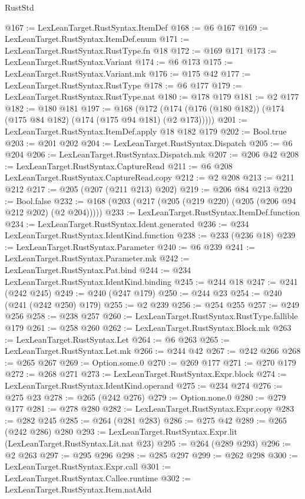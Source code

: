 \begin{lexlean}{RustStd}
\begin{coremodule}
{\begin{coremodule}
{{{{{{{{{@167 := LexLeanTarget.RustSyntax.ItemDef
@168 := @6 @167
@169 := LexLeanTarget.RustSyntax.ItemDef.enum
@171 := LexLeanTarget.RustSyntax.RustType.fn @18
@172 := @169 @171
@173 := LexLeanTarget.RustSyntax.Variant
@174 := @6 @173
@175 := LexLeanTarget.RustSyntax.Variant.mk
@176 := @175 @42
@177 := LexLeanTarget.RustSyntax.RustType
@178 := @6 @177
@179 := LexLeanTarget.RustSyntax.RustType.nat
@180 := @178 @179
@181 := @2 @177
@182 := @180 @181
@197 := @168
    (@172 (@174 (@176 (@180 @182)) (@174 (@175 @84 @182) (@174 (@175 @94 @181) (@2 @173)))))
@201 := LexLeanTarget.RustSyntax.ItemDef.apply @18 @182 @179
@202 := Bool.true
@203 := @201 @202
@204 := LexLeanTarget.RustSyntax.Dispatch
@205 := @6 @204
@206 := LexLeanTarget.RustSyntax.Dispatch.mk
@207 := @206 @42
@208 := LexLeanTarget.RustSyntax.CaptureRead
@211 := @6 @208 LexLeanTarget.RustSyntax.CaptureRead.copy
@212 := @2 @208
@213 := @211 @212
@217 := @205 (@207 (@211 @213) @202)
@219 := @206 @84 @213
@220 := Bool.false
@232 := @168 (@203 (@217 (@205 (@219 @220) (@205 (@206 @94 @212 @202) (@2 @204)))))
@233 := LexLeanTarget.RustSyntax.ItemDef.function
@234 := LexLeanTarget.RustSyntax.Ident.generated
@236 := @234 LexLeanTarget.RustSyntax.IdentKind.function
@238 := @233 (@236 @18)
@239 := LexLeanTarget.RustSyntax.Parameter
@240 := @6 @239
@241 := LexLeanTarget.RustSyntax.Parameter.mk
@242 := LexLeanTarget.RustSyntax.Pat.bind
@244 := @234 LexLeanTarget.RustSyntax.IdentKind.binding
@245 := @244 @18
@247 := @241 (@242 @245)
@249 := @240 (@247 @179)
@250 := @244 @23
@254 := @240 (@241 (@242 @250) @179)
@255 := @2 @239
@256 := @254 @255
@257 := @249 @256
@258 := @238 @257
@260 := LexLeanTarget.RustSyntax.RustType.fallible @179
@261 := @258 @260
@262 := LexLeanTarget.RustSyntax.Block.mk
@263 := LexLeanTarget.RustSyntax.Let
@264 := @6 @263
@265 := LexLeanTarget.RustSyntax.Let.mk
@266 := @244 @42
@267 := @242 @266
@268 := @265 @267
@269 := Option.some.{0}
@270 := @269 @177
@271 := @270 @179
@272 := @268 @271
@273 := LexLeanTarget.RustSyntax.Expr.block
@274 := LexLeanTarget.RustSyntax.IdentKind.operand
@275 := @234 @274
@276 := @275 @23
@278 := @265 (@242 @276)
@279 := Option.none.{0}
@280 := @279 @177
@281 := @278 @280
@282 := LexLeanTarget.RustSyntax.Expr.copy
@283 := @282 @245
@285 := @264 (@281 @283)
@286 := @275 @42
@289 := @265 (@242 @286) @280
@293 := LexLeanTarget.RustSyntax.Expr.lit (LexLeanTarget.RustSyntax.Lit.nat @23)
@295 := @264 (@289 @293)
@296 := @2 @263
@297 := @295 @296
@298 := @285 @297
@299 := @262 @298
@300 := LexLeanTarget.RustSyntax.Expr.call
@301 := LexLeanTarget.RustSyntax.Callee.runtime
@302 := LexLeanTarget.RustSyntax.Item.natAdd
}}}}}}}}}
\end{coremodule}}
\end{coremodule}
\end{lexlean}
